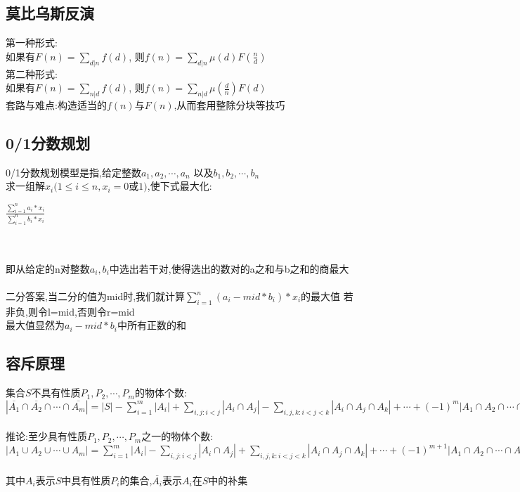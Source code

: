 \documentclass[twocolumn,a4]{article}
\begin{document}
\subsection{莫比乌斯反演}
第一种形式:\\
如果有$F(n) = \sum_{d|n}f(d)$,
则$f(n) = \sum_{d|n}\mu(d)F(\frac{n}{d})$\\
第二种形式:\\
如果有$F(n) = \sum_{n|d}f(d)$,
则$f(n) = \sum_{n|d}\mu(\frac{d}{n})F(d)$\\
套路与难点:构造适当的$f(n)$与$F(n)$,从而套用整除分块等技巧

\subsection{0/1分数规划}
0/1分数规划模型是指,给定整数$a_{1},a_{2},\cdots ,a_{n}$
以及$b_{1},b_{2},\cdots ,b_{n}$\\
求一组解$x_{i}(1\leqslant i\leqslant n,x_{i}=0$或$1)$,使下式最大化:\\
\begin{LARGE}
    $\frac{\sum_{i=1}^{n} a_{i}*x_{i}}{\sum_{i=1}^{n} b_{i}*x_{i}} $
\end{LARGE}
\\
\\
即从给定的n对整数$a_{i},b_{i}$中选出若干对,使得选出的数对的a之和与b之和的商最大
\\
\\
二分答案,当二分的值为mid时,我们就计算$\sum_{i=1}^{n}(a_{i}-mid*b_{i})*x_{i}$的最大值
若非负,则令l=mid,否则令r=mid\\
最大值显然为$a_{i}-mid*b_{i}$中所有正数的和\\

\subsection{容斥原理}
集合$S$不具有性质$P_{1},P_{2},\cdots ,P_{m}$的物体个数:\\
$\displaystyle\left\lvert \overline{A_{1}}\cap \overline{A_{2}}\cap \cdots \cap \overline{A_{m}}  \right\rvert = \left\lvert S \right\rvert -\sum_{i=1}^{m}\left\lvert A_{i} \right\rvert+\sum_{i,j:i<j}\left\lvert A_{i}\cap A_{j} \right\rvert - \sum_{i,j,k:i<j<k}\left\lvert A_{i}\cap A_{j}\cap A_{k} \right\rvert + \cdots +(-1)^{m}\left\lvert A_{1}\cap A_{2}\cap \cdots \cap A_{m} \right\rvert$\\
\\
推论:至少具有性质$P_{1},P_{2},\cdots ,P_{m}$之一的物体个数:\\
$\displaystyle\left\lvert A_{1}\cup A_{2}\cup \cdots \cup A_{m}  \right\rvert = \sum_{i=1}^{m}\left\lvert A_{i} \right\rvert-\sum_{i,j:i<j}\left\lvert A_{i}\cap A_{j} \right\rvert + \sum_{i,j,k:i<j<k}\left\lvert A_{i}\cap A_{j}\cap A_{k} \right\rvert + \cdots +(-1)^{m+1}\left\lvert A_{1}\cap A_{2}\cap \cdots \cap A_{m} \right\rvert$\\
\\
其中$A_{i}$表示$S$中具有性质$P_{i}$的集合,$\overline{A_{i}}$表示$A_{i}$在$S$中的补集\\
\end{document}
